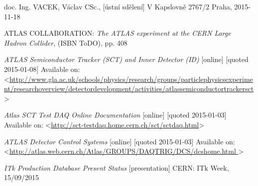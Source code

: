 \begin{thebibliography}{2}
	 doc. Ing. VACEK, Václav CSc., [ústní sdělení] V Kapslovně 2767/2  Praha, 2015-11-18
	
	 ATLAS COLLABORATION: \emph{The ATLAS experiment at the CERN Large Hadron Collider}, (ISBN ToDO), pp. 408
	
	 \emph{ATLAS Semiconductor Tracker (SCT) and Inner Detector (ID)} [online] [quoted 2015-01-08] Available on: <\url{http://www.gla.ac.uk/schools/physics/research/groups/particlephysicsexperiment/researchoverview/detectordevelopment/activities/atlassemiconductortrackersct}>

	 \emph{Atlas SCT Test DAQ Online Documentation} [online] [quoted 2015-01-03] Available on: <\url{http://sct-testdaq.home.cern.ch/sct/sctdaq.html}>
	
	 \emph{ATLAS  
Detector Control Systems} [online] [quoted 2015-01-03] Available on: <\url{http://atlas.web.cern.ch/Atlas/GROUPS/DAQTRIG/DCS/dcshome.html	}>

	 \emph{ITk Production Database Present Status} [presentation] CERN: ITk Week, 15/09/2015
   
   
\end{thebibliography}

\pagebreak

